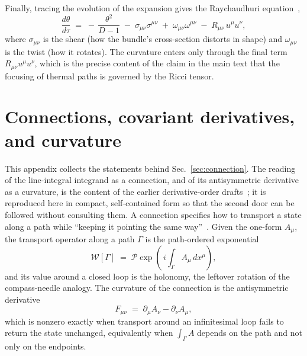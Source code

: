 \documentclass[%
 reprint, amsmath,amssymb, aps, prb, ]{revtex4-2}
\numberwithin{equation}{section}
\newcommand{\WL}{\mathcal{W}}
\begin{document}
Finally, tracing the evolution of the expansion gives the Raychaudhuri equation~\cite{Raychaudhuri1955},
\begin{equation}
\frac{d\theta}{d\tau} \;=\; -\,\frac{\theta^2}{D-1} \;-\; \sigma_{\mu\nu}\sigma^{\mu\nu} \;+\; \omega_{\mu\nu}\omega^{\mu\nu} \;-\; R_{\mu\nu}\,u^\mu u^\nu,
\label{eq:raychaudhuri}
\end{equation}
where $\sigma_{\mu\nu}$ is the shear (how the bundle's cross-section distorts in shape) and $\omega_{\mu\nu}$ is the twist (how it rotates). The curvature enters only through the final term $R_{\mu\nu}u^\mu u^\nu$, which is the precise content of the claim in the main text that the focusing of thermal paths is governed by the Ricci tensor.

\section{Connections, covariant derivatives, and curvature}
\label{app:connection}

This appendix collects the statements behind Sec.~\ref{sec:connection}. The reading of the line-integral integrand as a connection, and of its antisymmetric derivative as a curvature, is the content of the earlier derivative-order drafts~\cite{hanamura40,hanamura41}; it is reproduced here in compact, self-contained form so that the second door can be followed without consulting them. A connection specifies how to transport a state along a path while ``keeping it pointing the same way''~\cite{Nakahara2003}. Given the one-form $A_\mu$, the transport operator along a path $\Gamma$ is the path-ordered exponential
\begin{equation}
\WL[\Gamma] \;=\; \mathcal{P}\exp\!\left(\,i\!\int_\Gamma A_\mu\,dx^\mu\right),
\label{eq:wilson}
\end{equation}
and its value around a closed loop is the holonomy, the leftover rotation of the compass-needle analogy. The curvature of the connection is the antisymmetric derivative
\begin{equation}
F_{\mu\nu} \;=\; \partial_\mu A_\nu - \partial_\nu A_\mu,
\label{eq:F-app}
\end{equation}
which is nonzero exactly when transport around an infinitesimal loop fails to return the state unchanged, equivalently when $\int_\Gamma A$ depends on the path and not only on the endpoints.
\end{document}
